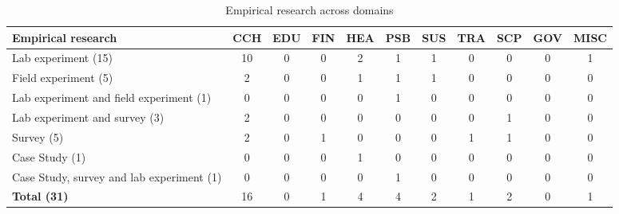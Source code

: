 \begin{table}[htbp]
\small
\centering
\begin{tabular}{|p{}|cccccccccc|}
\hline
\textbf{Empirical research} & \textbf{CCH} & \textbf{EDU} & \textbf{FIN} & \textbf{HEA} & \textbf{PSB} & \textbf{SUS} & \textbf{TRA} & \textbf{SCP} & \textbf{GOV} & \textbf{MISC} \\ \hline
Lab experiment (15) & 10 & 0 & 0 & 2 & 1 & 1 & 0 & 0 & 0 & 1 \\
Field experiment (5) & 2 & 0 & 0 & 1 & 1 & 1 & 0 & 0 & 0 & 0 \\
Lab experiment and field experiment (1) & 0 & 0 & 0 & 0 & 1 & 0 & 0 & 0 & 0 & 0 \\
Lab experiment and survey (3) & 2 & 0 & 0 & 0 & 0 & 0 & 0 & 1 & 0 & 0 \\
Survey (5) & 2 & 0 & 1 & 0 & 0 & 0 & 1 & 1 & 0 & 0 \\
Case Study (1) & 0 & 0 & 0 & 1 & 0 & 0 & 0 & 0 & 0 & 0 \\
Case Study, survey and lab experiment (1) & 0 & 0 & 0 & 0 & 1 & 0 & 0 & 0 & 0 & 0 \\ \hline
\textbf{Total (31)} & 16 & 0 & 1 & 4 & 4 & 2 & 1 & 2 & 0 & 1 \\ \hline
\end{tabular}
\caption{Empirical research across domains}
\label{table:empirical}
\end{table}


